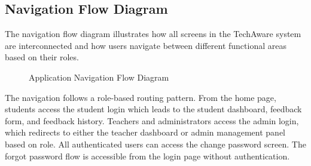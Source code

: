 
\subsection{Navigation Flow Diagram}

The navigation flow diagram illustrates how all screens in the TechAware system are interconnected and how users navigate between different functional areas based on their roles.

\begin{figure}[H]
\centering
{}
\caption{Application Navigation Flow Diagram}
\label{fig:navflow}
\end{figure}

The navigation follows a role-based routing pattern. From the home page, students access the student login which leads to the student dashboard, feedback form, and feedback history. Teachers and administrators access the admin login, which redirects to either the teacher dashboard or admin management panel based on role. All authenticated users can access the change password screen. The forgot password flow is accessible from the login page without authentication.



